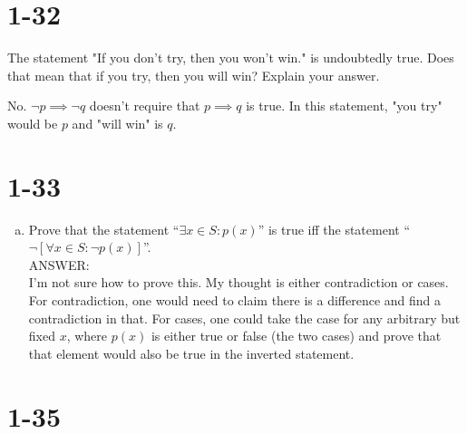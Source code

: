 \documentclass{article}
\begin{document}
\newpage

\section{1-32}

The statement "If you don't try, then you won't win." is undoubtedly true.  Does
that mean that if you try, then you will win? Explain your answer.

No. $\neg p \implies \neg q$ doesn't require that $p \implies q$ is true.  In
this statement, "you try" would be $p$ and "will win" is $q$.


\section{1-33}

\begin{enumerate}[a)]
    \item Prove that the statement ``$\exists x \in S : p(x)$'' is true iff the
        statement ``$\neg [\forall x \in S : \neg p(x)]$''. \\
        ANSWER: \\ %
        I'm not sure how to prove this. My thought is either contradiction or
        cases.  For contradiction, one would need to claim there is a difference
        and find a contradiction in that.  For cases, one could take the case
        for any arbitrary but fixed $x$, where $p(x)$ is either true or false
        (the two cases) and prove that that element would also be true in the
        inverted statement.
\end{enumerate}

\section{1-35}
\end{document}
